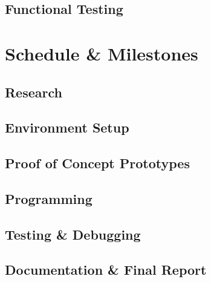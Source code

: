 \subsection{Functional Testing}

\section{Schedule \& Milestones}
\subsection{Research}
\subsection{Environment Setup}
\subsection{Proof of Concept Prototypes}
\subsection{Programming}
\subsection{Testing \& Debugging}
\subsection{Documentation \& Final Report}